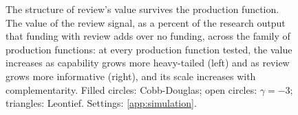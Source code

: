 \begin{figure}[tp]
\caption{The structure of review's value survives the production function. The value of the review signal, as a percent of the research output that funding with review adds over no funding, across the family of production functions: at every production function tested, the value increases as capability grows more heavy-tailed (left) and as review grows more informative (right), and its scale increases with complementarity. Filled circles: Cobb-Douglas; open circles: $\gamma = -3$; triangles: Leontief. Settings: \ref{app:simulation}.}
\label{fig:signal-robustness}
\end{figure}
